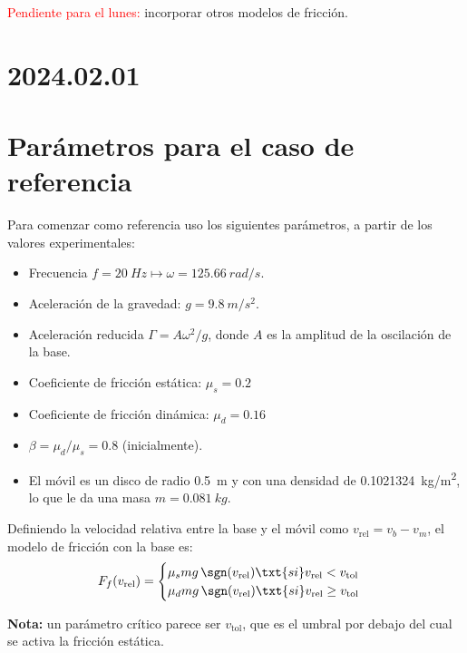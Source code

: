 \documentclass[11pt]{article}
\begin{document}
\textcolor{red}{Pendiente para el lunes:} incorporar otros modelos de fricción.


\section*{2024.02.01}

\section*{Parámetros para el caso de referencia}

Para comenzar como referencia uso los siguientes parámetros, a partir de los valores experimentales:

\begin{itemize}
\item Frecuencia $f = \qty{20}{Hz} \mapsto \omega = \qty{125.66}{rad/s}$.
\item Aceleración de la gravedad: $g = \qty{9.8}{m/s^2}$.
\item Aceleración reducida $\Gamma = A \omega^2/g$, donde $A$ es la amplitud de la oscilación de la base.
\item Coeficiente de fricción estática: $\mu_s = 0.2$
\item Coeficiente de fricción dinámica: $\mu_d = 0.16$
\item $\beta = \mu_d / \mu_s = 0.8$ (inicialmente).
\item El móvil es un disco de radio \qty{0.5}{m} y con una densidad de \qty{0.1021324}{kg/m^2}, lo que le da una masa $m = \qty{0.081}{kg}$.
\end{itemize}

Definiendo la velocidad relativa entre la base y el móvil como $v_{\text{rel}} = v_b - v_m$, el modelo de fricción con la base es: 
\begin{equation}
    F_f(v_{\text{rel}}) = 
    \begin{cases}
        \mu_s m g \, \sgn(v_{\text{rel}}) \txt{si} v_{\text{rel}} < v_{\text{tol}} \\
        \mu_d m g \, \sgn(v_{\text{rel}}) \txt{si} v_{\text{rel}} \geq v_{\text{tol}}  \\
    \end{cases}
\end{equation}


\textbf{Nota:} un parámetro crítico parece ser $v_{\text{tol}}$, que es el umbral por debajo del cual se activa la fricción estática. 
\end{document}
